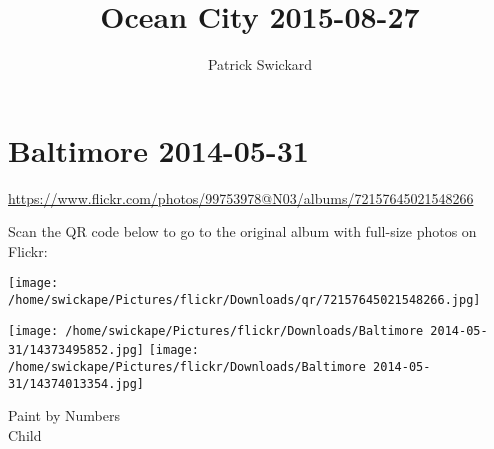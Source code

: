 \documentclass[10pt,letterpaper]{article}
\title{Ocean City 2015-08-27}
\author{Patrick Swickard}
\date{}
\begin{document}
\section*{Baltimore 2014-05-31}

\url{https://www.flickr.com/photos/99753978@N03/albums/72157645021548266}

Scan the QR code below to go to the original album with full-size photos on Flickr:

\texttt{[image: /home/swickape/Pictures/flickr/Downloads/qr/72157645021548266.jpg]}
\pagebreak

\texttt{[image: /home/swickape/Pictures/flickr/Downloads/Baltimore 2014-05-31/14373495852.jpg]}
\texttt{[image: /home/swickape/Pictures/flickr/Downloads/Baltimore 2014-05-31/14374013354.jpg]}

Paint by Numbers\\
Child
\pagebreak
\end{document}
